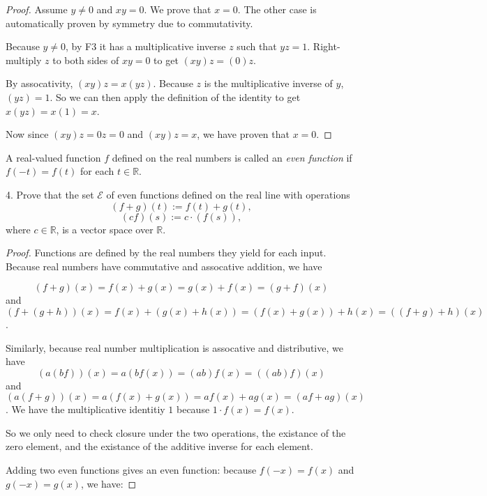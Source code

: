 \documentclass[12pt]{article} %
\newcommand{\R}{\mathbb{R}}
\newcommand{\calE}{\mathcal{E}}
\begin{document}
\begin{flushleft}
\vspace{0.5cm}
\begin{proof}
Assume $y\neq 0$ and $xy = 0$. We prove that $x=0$. The other case is automatically proven by symmetry due to commutativity.

Because $y\neq 0$, by F3 it has a multiplicative inverse $z$ such that $yz = 1$. Right-multiply $z$ to both sides of $xy = 0$ to get $(xy)z = (0)z$. 

By assocativity, $(xy)z = x(yz)$. Because $z$ is the multiplicative inverse of $y$, $(yz) = 1$. So we can then apply the definition of the identity to get $x(yz) = x(1) = x$.

Now since $(xy)z = 0z = 0$ and $(xy)z = x$, we have proven that $x=0$.


\end{proof}
\vspace{1cm}

\newpage%

A real-valued function $f$ defined on the real numbers is called an \textit{even function} if $f(-t) = f(t)$ for each $t \in \R$.\\

\vspace{.5cm}

4.  Prove that the set $\calE$ of even functions defined on the real line with operations 
\[ (f + g)(t) := f(t) + g(t),\]
\[ (cf)(s) := c \cdot (f(s)),\]
where $c \in \R$, is a vector space over $\R$.

\begin{proof}

Functions are defined by the real numbers they yield for each input. Because real numbers have commutative and assocative addition, we have 

$$(f+g)(x) = f(x)+g(x) = g(x) + f(x) = (g+f)(x)$$
and
$$(f+(g+h))(x) = f(x) + (g(x) + h(x)) = (f(x) + g(x)) + h(x) = ((f+g)+h)(x)$$.

Similarly, because real number multiplication is assocative and distributive, we have
$$(a(bf))(x) = a(bf(x)) = (ab)f(x) = ((ab)f)(x)$$
and
$$( a(f+g) )(x) = a(f(x) + g(x)) = af(x) + ag(x) = (af+ag)(x)$$. We have the multiplicative identitiy $1$ because $1\cdot f(x) = f(x)$. 

So we only need to check closure under the two operations, the existance of the zero element, and the existance of the additive inverse for each element.

Adding two even functions gives an even function: because $f(-x) = f(x)$ and $g(-x) = g(x)$, we have:


\end{proof}
\end{flushleft}
\end{document}

